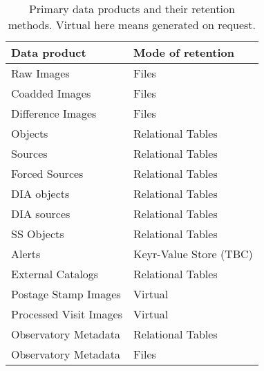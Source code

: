 
\begin{table}
\caption{Primary data products and their retention methods. Virtual here means generated on request. \label{tab:prods}}
\begin{center}
\begin{tabular}{|l|l|}\hline
\textbf{Data product}&\textbf{Mode of retention}\\\hline
Raw Images  & Files \\\hline
Coadded Images & Files \\\hline
Difference Images  & Files \\\hline
Objects & Relational Tables \\\hline
Sources  & Relational Tables \\\hline
Forced Sources & Relational Tables \\\hline
DIA objects & Relational Tables \\\hline
DIA sources  & Relational Tables \\\hline
SS Objects  & Relational Tables \\\hline
Alerts & Keyr-Value Store (TBC) \\\hline
External Catalogs & Relational Tables \\\hline
Postage Stamp Images & Virtual \\\hline
Processed Visit Images & Virtual \\\hline
Observatory Metadata  & Relational Tables \\\hline
Observatory Metadata & Files \\\hline
      \end{tabular}
\end{center}
\end{table}
